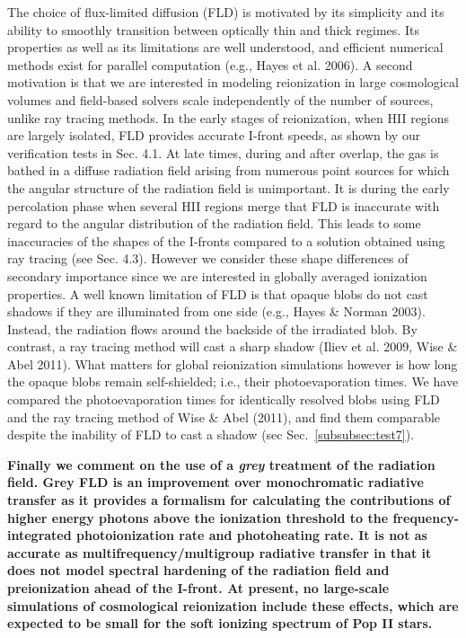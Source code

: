The choice of flux-limited diffusion (FLD) is motivated by its
simplicity and its ability to smoothly transition between optically
thin and thick regimes. Its properties as well as its limitations are
well understood, and efficient numerical methods exist for parallel
computation (e.g., Hayes et al. 2006). A second motivation is that we
are interested in modeling reionization in large cosmological volumes
and field-based solvers scale independently of the number of sources, unlike ray tracing
methods. In the early stages of reionization, when HII regions are
largely isolated, FLD provides accurate I-front speeds, as shown by
our verification tests in Sec. 4.1. At late times, during and after
overlap, the gas is bathed in a diffuse radiation field arising from
numerous point sources for which the angular structure of the
radiation field is unimportant. It is during the early percolation
phase when several HII regions merge that FLD is inaccurate with
regard to the angular distribution of the radiation field. This leads
to some inaccuracies of the shapes of the I-fronts compared to a
solution obtained using ray tracing (see Sec. 4.3). However we
consider these shape differences of secondary importance since we are
interested in globally averaged ionization properties. A well known
limitation of FLD is that opaque blobs do not cast shadows if they are illuminated from one side (e.g.,
Hayes \& Norman 2003). Instead, the radiation flows around the
backside of the irradiated blob. By contrast, a ray tracing method
will cast a sharp shadow (Iliev et al. 2009, Wise \& Abel 2011). What
matters for global reionization simulations however is how long the
opaque blobs remain self-shielded; i.e., their photoevaporation
times. We have compared the photoevaporation times for identically
resolved blobs using FLD and the ray tracing method of Wise \& Abel
(2011), and find them comparable despite the inability of FLD to cast
a shadow (sec Sec.~\ref{subsubsec:test7}). 

{\bf Finally we comment on the use of a {\em grey} treatment of the radiation field. 
Grey FLD is an improvement over monochromatic radiative transfer as it provides a formalism for calculating the contributions of higher energy photons above the ionization threshold to the frequency-integrated photoionization rate and photoheating rate. It is not as accurate as multifrequency/multigroup radiative transfer in that it does not model spectral hardening of the radiation field and preionization ahead of the I-front. At present, no large-scale simulations of cosmological reionization include these effects, which are expected to be small for the soft ionizing spectrum of Pop II stars. }



